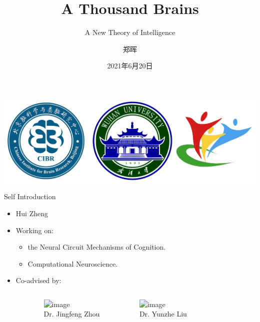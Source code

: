 \documentclass{beamer}
\author{郑晖}
\title{A Thousand Brains}
\subtitle{A New Theory of Intelligence}
\institute{武汉大学弘毅学堂}
\date{2021年6月20日}
\begin{document}
\kaishu
\begin{frame}
  \titlepage
  \begin{center}
    \includegraphics[width=0.6\linewidth]{logo/logo.png}
  \end{center}
\end{frame}

\begin{frame}{Self Introduction}
  \begin{itemize}
    \item Hui Zheng
    \item Working on:
    \begin{itemize}
      \item the Neural Circuit Mechanisms of Cognition.
      \item Computational Neuroscience.
    \end{itemize}
    \item Co-advised by:
  \end{itemize}

  \begin{columns}
    \begin{column}{.2\linewidth}\end{column}
    \begin{column}{.3\linewidth}
      \begin{center}
        \includegraphics<1>[width=.6\linewidth]{figs/jingfengzhou.jpg}\\
        Dr. Jingfeng Zhou
      \end{center}
    \end{column}

    \begin{column}{.3\linewidth}
      \begin{center}
        \includegraphics<1>[width=.6\linewidth]{figs/yunzheliu.jpg}\\
        Dr. Yunzhe Liu
      \end{center}
    \end{column}
    \begin{column}{.2\linewidth}\end{column}
  \end{columns}
\end{frame}
\end{document}
